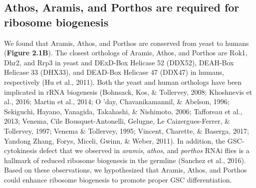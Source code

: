\documentclass[12pt,oneside]{reedthesis}
\begin{document}

\textbf{\hfill\break
}

\hypertarget{athos-aramis-and-porthos-are-required-for-ribosome-biogenesis}{%
\subsection{Athos, Aramis, and Porthos are required for ribosome biogenesis}\label{athos-aramis-and-porthos-are-required-for-ribosome-biogenesis}}

We found that Aramis, Athos, and Porthos are conserved from yeast to humans (\textbf{Figure 2.1B}). The closest orthologs of Aramis, Athos, and Porthos are Rok1, Dhr2, and Rrp3 in yeast and DExD-Box Helicase 52 (DDX52), DEAH-Box Helicase 33 (DHX33), and DEAD-Box Helicase 47 (DDX47) in humans, respectively (Hu et al., 2011). Both the yeast and human orthologs have been implicated in rRNA biogenesis (Bohnsack, Kos, \& Tollervey, 2008; Khoshnevis et al., 2016; Martin et al., 2014; O 'day, Chavanikamannil, \& Abelson, 1996; Sekiguchi, Hayano, Yanagida, Takahashi, \& Nishimoto, 2006; Tafforeau et al., 2013; Venema, Cile Bousquet-Antonelli, Gelugne, Le Caizergues-Ferrer, \& Tollervey, 1997; Venema \& Tollervey, 1995; Vincent, Charette, \& Baserga, 2017; Yandong Zhang, Forys, Miceli, Gwinn, \& Weber, 2011). In addition, the GSC-cytokinesis defect that we observed in \emph{aramis}, \emph{athos}, and \emph{porthos} RNAi flies is a hallmark of reduced ribosome biogenesis in the germline (Sanchez et al., 2016). Based on these observations, we hypothesized that Aramis, Athos, and Porthos could enhance ribosome biogenesis to promote proper GSC differentiation.
\end{document}
